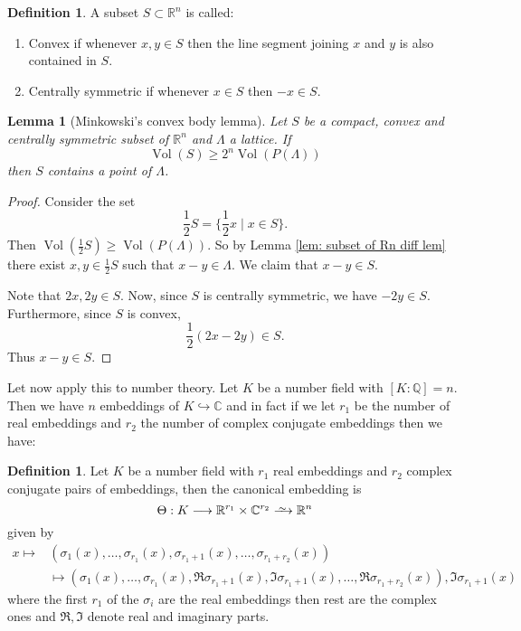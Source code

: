 \documentclass[11pt,a4paper]{report}
\theoremstyle{plain}
\newtheorem{lem}[subsection]{Lemma}
\theoremstyle{definition}
\newtheorem{defn}[subsection]{Definition}
\theoremstyle{definition}
\newcommand{\RR}{\mathbb{R}}
\def\CC{\mathbb{C}}
\def\QQ{\mathbb{Q}}
\def \s {\sigma}
\def \s {\sigma}
\DeclareMathOperator{\Vol}{Vol}
\def \lra{\longrightarrow}
\newcommand\isorightarrow{\xrightarrow{
		\,\smash{\raisebox{-0.65ex}{\ensuremath{\scriptstyle\sim}}}\,}}
\begin{document}
	\begin{defn}
		A subset $S \subset \RR^n$ is called:
		\begin{enumerate}
			\item Convex if whenever $x,y \in S$ then the line segment joining $x$ and $y$ is also contained in $S$.
			\item Centrally symmetric if whenever $x \in S$ then $-x \in S$.
		\end{enumerate}
	\end{defn}
	
	\begin{lem}[Minkowski's convex body lemma]\label{lem: mink conv bod}
		Let $S$ be a compact, convex and centrally symmetric subset of $\RR^n$ and $\Lambda$ a lattice. If \[\Vol(S) \geq 2^n \Vol(P(\Lambda))\] then $S$ contains a point of $\Lambda$. 
	\end{lem}
	
	\begin{proof}
		Consider the set \[\frac{1}{2}S=\{\frac{1}{2} x \mid x \in S\}.\] Then $\Vol(\frac{1}{2}S) \geq \Vol(P(\Lambda))$. So by Lemma \ref{lem: subset of Rn diff lem} there exist $x,y \in \frac{1}{2}S$ such that $x-y \in \Lambda$. We claim that $x-y \in S$. 
		
		Note that $2x,2y \in S$. Now, since $S$ is centrally symmetric, we have $-2y \in S$. Furthermore, since $S$ is convex, \[\frac{1}{2} (2x-2y) \in S.\] Thus $x-y \in S$.
	\end{proof}
	
	Let now apply this to number theory. Let $K$ be a number field with $[K:\QQ]=n$. Then we have $n$ embeddings of $K \hookrightarrow \CC$ and in fact if we let $r_1$ be the number of real embeddings and $r_2$ the number of complex conjugate embeddings then we have:
	
	\begin{defn}
		Let $K$ be a number field with $r_1$ real embeddings and $r_2$ complex conjugate pairs of embeddings, then the canonical embedding is \[\Theta: K \lra \RR^{r_1} \times \CC^{r_2} \isorightarrow \RR^n\] given by \begin{align*}
			x \mapsto& (\s_1(x),\dots,\s_{r_1}(x),\s_{r_1+1}(x),\dots,\s_{r_1+r_2}(x))\\ &\mapsto (\s_1(x),\dots,\s_{r_1}(x),\Re \s_{r_1+1}(x),\Im\s_{r_1+1}(x), \dots,\Re \s_{r_1+r_2}(x)), \Im \s_{r_1+1}(x) 
		\end{align*} where the first $r_1$ of the $\s_i$ are the real embeddings then rest are the complex ones and $\Re,\Im$ denote real and imaginary parts.
	\end{defn}
	
\end{document}
